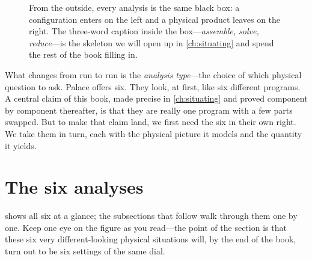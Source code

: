 \begin{figure}[t]
\centering
{}
\caption[The simulator as a black box]{From the outside, every analysis is the
same black box: a configuration enters on the left and a physical product leaves
on the right. The three-word caption inside the box---\emph{assemble, solve,
reduce}---is the skeleton we will open up in \cref{ch:situating} and spend the
rest of the book filling in.}
\label{fig:blackbox}
\end{figure}

What changes from run to run is the \emph{analysis type}---the choice of which
physical question to ask. Palace offers six. They look, at first, like six
different programs. A central claim of this book, made precise in
\cref{ch:situating} and proved component by component thereafter, is that they
are really one program with a few parts swapped. But to make that claim land, we
first need the six in their own right. We take them in turn, each with the
physical picture it models and the quantity it yields.

\section{The six analyses}

 shows all six at a glance; the subsections that follow
walk through them one by one. Keep one eye on the figure as you read---the point
of the section is that these six very different-looking physical situations will,
by the end of the book, turn out to be six settings of the same dial.

